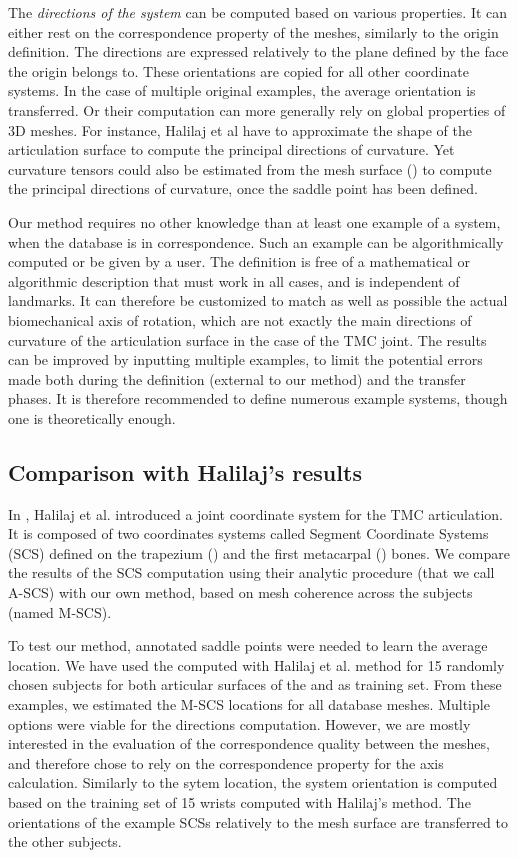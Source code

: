 The \textit{directions of the system} can be computed based on various properties. It can either rest on the correspondence property of the meshes, similarly to the origin definition. The directions are expressed relatively to the plane defined by the face the origin belongs to. These orientations are copied for all other coordinate systems. In the case of multiple original examples, the average orientation is transferred. Or their computation can more generally rely on global properties of 3D meshes. For instance, Halilaj et al have to approximate the shape of the articulation surface to compute the principal directions of curvature. Yet curvature tensors could also be estimated from the mesh surface (\cite{cohen_2003_restricted}) to compute the principal directions of curvature, once the saddle point has been defined. 

Our method requires no other knowledge than at least one example of a system, when the database is in correspondence. Such an example can be algorithmically computed or be given by a user. The definition is free of a mathematical or algorithmic description that must work in all cases, and is independent of landmarks. It can therefore be customized to match as well as possible the actual biomechanical axis of rotation, which are not exactly the main directions of curvature of the articulation surface in the case of the TMC joint. The results can be improved by inputting multiple examples, to limit the potential errors made both during the definition (external to our method) and the transfer phases. It is therefore recommended to define numerous example systems, though one is theoretically enough.



\subsection{Comparison with Halilaj's results}
\label{ssec:4_comparison_halilaj}


In \cite{halilaj_2013_thumb}, Halilaj et al. introduced a joint coordinate system for the TMC articulation. It is composed of two coordinates systems called Segment Coordinate Systems (SCS) defined on the trapezium (\tpm*) and the first metacarpal (\mcu*) bones. We compare the results of the SCS computation using their analytic procedure (that we call A-SCS) with our own method, based on mesh coherence across the subjects (named M-SCS). 

To test our method, annotated saddle points were needed to learn the average location. We have used the \soc* computed with Halilaj et al. method for 15 randomly chosen subjects for both articular surfaces of the \tpm* and \mcu* as training set. From these examples, we estimated the M-SCS locations for all database meshes. Multiple options were viable for the directions computation. However, we are mostly interested in the evaluation of the correspondence quality between the meshes, and therefore chose to rely on the correspondence property for the axis calculation. Similarly to the sytem location, the system orientation is computed based on the training set of 15 wrists computed with Halilaj's method.
The orientations of the example SCSs relatively to the mesh surface are transferred to the other subjects. 

